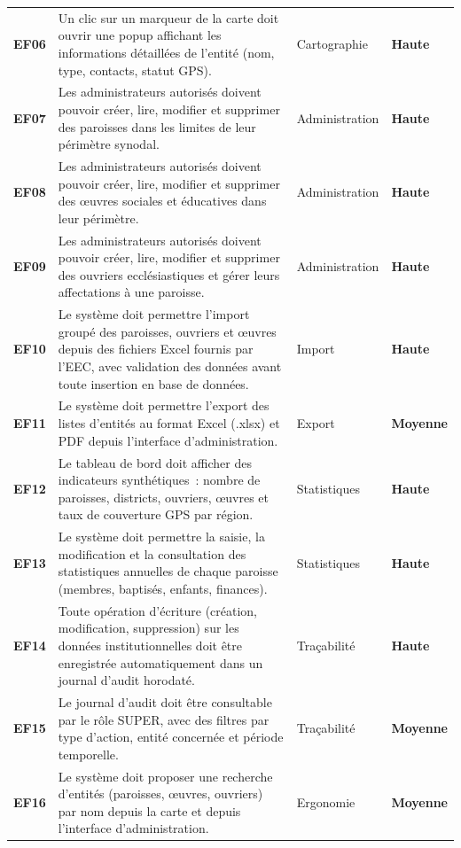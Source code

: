\documentclass[12pt, a4paper]{report}
\begin{document}
\begin{longtable}{%
  >{\bfseries\color{eccdarkgreen}}m{1.2cm}
  m{7.8cm}
  m{3.5cm}
  >{\centering\arraybackslash\bfseries}m{1.7cm}}
EF06 & Un clic sur un marqueur de la carte doit ouvrir une popup affichant
  les informations détaillées de l'entité (nom, type, contacts, statut GPS). &
  Cartographie & Haute \\
\rowcolor{eeclightgreen!60}
EF07 & Les administrateurs autorisés doivent pouvoir créer, lire, modifier et
  supprimer des paroisses dans les limites de leur périmètre synodal. &
  Administration & Haute \\
EF08 & Les administrateurs autorisés doivent pouvoir créer, lire, modifier et
  supprimer des œuvres sociales et éducatives dans leur périmètre. &
  Administration & Haute \\
\rowcolor{eeclightgreen!60}
EF09 & Les administrateurs autorisés doivent pouvoir créer, lire, modifier et
  supprimer des ouvriers ecclésiastiques et gérer leurs affectations à une
  paroisse. & Administration & Haute \\
EF10 & Le système doit permettre l'import groupé des paroisses, ouvriers et
  œuvres depuis des fichiers Excel fournis par l'EEC, avec validation des
  données avant toute insertion en base de données. & Import & Haute \\
\rowcolor{eeclightgreen!60}
EF11 & Le système doit permettre l'export des listes d'entités au format
  Excel (.xlsx) et PDF depuis l'interface d'administration. & Export & Moyenne \\
EF12 & Le tableau de bord doit afficher des indicateurs synthétiques~:
  nombre de paroisses, districts, ouvriers, œuvres et taux de couverture
  GPS par région. & Statistiques & Haute \\
\rowcolor{eeclightgreen!60}
EF13 & Le système doit permettre la saisie, la modification et la
  consultation des statistiques annuelles de chaque paroisse (membres,
  baptisés, enfants, finances). & Statistiques & Haute \\
EF14 & Toute opération d'écriture (création, modification, suppression) sur
  les données institutionnelles doit être enregistrée automatiquement dans
  un journal d'audit horodaté. & Traçabilité & Haute \\
\rowcolor{eeclightgreen!60}
EF15 & Le journal d'audit doit être consultable par le rôle SUPER, avec des
  filtres par type d'action, entité concernée et période temporelle. &
  Traçabilité & Moyenne \\
EF16 & Le système doit proposer une recherche d'entités (paroisses, œuvres,
  ouvriers) par nom depuis la carte et depuis l'interface d'administration. &
  Ergonomie & Moyenne \\

\end{longtable}
\end{document}
